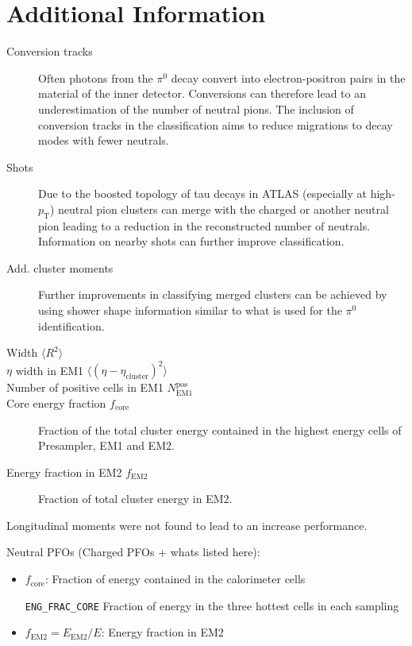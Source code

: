 \section{Additional Information}

\begin{description}
\item[Conversion tracks] Often photons from the $\pi^0$ decay convert into
  electron-positron pairs in the material of the inner detector. Conversions can
  therefore  lead to an
  underestimation of the number of neutral pions. The inclusion of conversion
  tracks in the classification aims to reduce migrations to decay modes with
  fewer neutrals.

\item[Shots] Due to the boosted topology of tau decays in ATLAS (especially at
  high-$p_\text{T}$) neutral pion clusters can merge with the charged or another
  neutral pion leading to a reduction in the reconstructed number of neutrals.
  Information on nearby shots 
  can further improve classification.

\item[Add. cluster moments] Further improvements in classifying merged clusters
  can be achieved by using shower shape information similar to what is used for
  the $\pi^0$ identification.
\end{description}

\begin{description}
\item[Width $\langle R^2 \rangle$]
\item[$\eta$ width in EM1 $\langle (\eta - \eta_\text{cluster})^2\rangle$]
\item[Number of positive cells in EM1 $N_\text{EM1}^\text{pos}$]
\item[Core energy fraction $f_\text{core}$] Fraction of the total cluster energy
  contained in the highest energy cells of Presampler, EM1 and EM2.
\item[Energy fraction in EM2 $f_\text{EM2}$] Fraction of total cluster energy in
  EM2.
\end{description}
Longitudinal moments were not found to lead to an increase performance.


Neutral PFOs (Charged PFOs + whats listed here):
\begin{itemize}
\item $f_\text{core}$: Fraction of energy contained in the  calorimeter cells



  \texttt{ENG\_FRAC\_CORE} Fraction of energy in the three
  hottest cells in each sampling 
\item $f_\text{EM2} = E_\text{EM2} / E$: Energy fraction in EM2 
\end{itemize}


